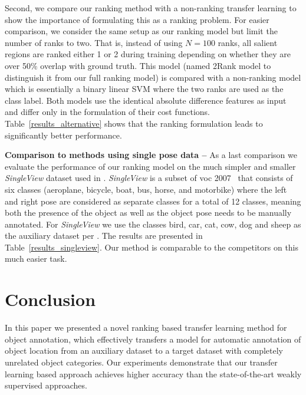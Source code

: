 \documentclass{bmvc2k}
\def\vocs{{\sc voc} 2007}
\begin{document}
Second, we compare our ranking method with a non-ranking transfer learning to show the importance of formulating this as a ranking problem. For easier comparison, we consider the same setup as our ranking model but limit the number of ranks to two. That is, instead of using $N=100$ ranks, all salient regions are ranked either 1 or 2 during training depending on whether they are over 50\% overlap with ground truth. This model (named 2Rank model to distinguish it from our full ranking model) is compared with a non-ranking model which is essentially a binary linear SVM where the two ranks are used as the class label. Both models use the identical absolute difference features as input and differ only in the formulation of their cost functions. Table~\ref{results_alternative} shows that the ranking formulation leads to significantly better performance.




\noindent \textbf{Comparison to methods using single pose data --}
As a last comparison we evaluate the performance of our ranking model on the much simpler and smaller \textit{SingleView} dataset used in \cite{Deselaerslocalizing2010, Pandeyiccv2011, Sivaiccv2011}. \textit{SingleView} is a subset of \vocs~ that consists of six classes (aeroplane, bicycle, boat, bus, horse, and motorbike) where the left and right pose are considered as separate classes for a total of 12 classes, meaning both the presence of the object as well as the object pose needs to be manually annotated. For \textit{SingleView} we use the classes bird, car, cat, cow, dog and sheep as the auxiliary dataset per \cite{Deselaerslocalizing2010}. The results are presented in Table~\ref{results_singleview}. Our method is comparable to the competitors on this much easier task.

 
\section{Conclusion}

In this paper we presented a novel ranking based transfer learning method for object annotation, which effectively transfers a model for automatic annotation of object location from an auxiliary dataset to a target dataset with completely unrelated object categories. Our experiments demonstrate that our transfer learning based approach achieves higher accuracy than the state-of-the-art weakly supervised approaches.



\end{document}
